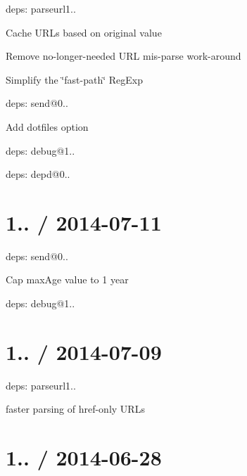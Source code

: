 \begin{DoxyItemize}
\item deps\+: parseurl1..
\begin{DoxyItemize}
\item Cache U\+R\+Ls based on original value
\item Remove no-\/longer-\/needed U\+RL mis-\/parse work-\/around
\item Simplify the \char`\"{}fast-\/path\char`\"{} {\ttfamily Reg\+Exp}
\end{DoxyItemize}
\item deps\+: send@0..
\begin{DoxyItemize}
\item Add {\ttfamily dotfiles} option
\item deps\+: debug@1..
\item deps\+: depd@0..
\end{DoxyItemize}
\end{DoxyItemize}

\section*{1.. / 2014-\/07-\/11 }


\begin{DoxyItemize}
\item deps\+: send@0..
\begin{DoxyItemize}
\item Cap {\ttfamily max\+Age} value to 1 year
\item deps\+: debug@1..
\end{DoxyItemize}
\end{DoxyItemize}

\section*{1.. / 2014-\/07-\/09 }


\begin{DoxyItemize}
\item deps\+: parseurl1..
\begin{DoxyItemize}
\item faster parsing of href-\/only U\+R\+Ls
\end{DoxyItemize}
\end{DoxyItemize}

\section*{1.. / 2014-\/06-\/28 }


